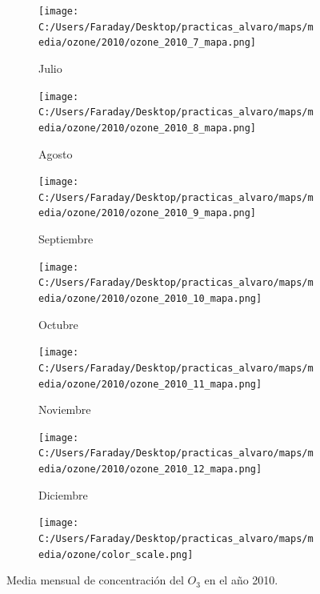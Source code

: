 \documentclass[12pt]{article}
\begin{document}
\begin{figure}[H]
\begin{subfigure}[H]{0.15\textwidth}
\texttt{[image: C:/Users/Faraday/Desktop/practicas\_alvaro/maps/media/ozone/2010/ozone\_2010\_7\_mapa.png]}
\captionsetup{labelformat=empty}
\caption{Julio}
\label{fig:map-ozone-2010-7}
\end{subfigure}
%
\begin{subfigure}[H]{0.15\textwidth}
\texttt{[image: C:/Users/Faraday/Desktop/practicas\_alvaro/maps/media/ozone/2010/ozone\_2010\_8\_mapa.png]}
\captionsetup{labelformat=empty}
\caption{Agosto}
\label{fig:map-ozone-2010-8}
\end{subfigure}
%
\begin{subfigure}[H]{0.15\textwidth}
\texttt{[image: C:/Users/Faraday/Desktop/practicas\_alvaro/maps/media/ozone/2010/ozone\_2010\_9\_mapa.png]}
\captionsetup{labelformat=empty}
\caption{Septiembre}
\label{fig:map-ozone-2010-9}
\end{subfigure}
%
\begin{subfigure}[H]{0.15\textwidth}
\texttt{[image: C:/Users/Faraday/Desktop/practicas\_alvaro/maps/media/ozone/2010/ozone\_2010\_10\_mapa.png]}
\captionsetup{labelformat=empty}
\caption{Octubre}
\label{fig:map-ozone-2010-10}
\end{subfigure}
%
\begin{subfigure}[H]{0.15\textwidth}
\texttt{[image: C:/Users/Faraday/Desktop/practicas\_alvaro/maps/media/ozone/2010/ozone\_2010\_11\_mapa.png]}
\captionsetup{labelformat=empty}
\caption{Noviembre}
\label{fig:map-ozone-2010-11}
\end{subfigure}
%
\begin{subfigure}[H]{0.15\textwidth}
\texttt{[image: C:/Users/Faraday/Desktop/practicas\_alvaro/maps/media/ozone/2010/ozone\_2010\_12\_mapa.png]}
\captionsetup{labelformat=empty}
\caption{Diciembre}
\label{fig:map-ozone-2010-12}
\end{subfigure}

\begin{subfigure}[H]{0.45\textwidth}
\texttt{[image: C:/Users/Faraday/Desktop/practicas\_alvaro/maps/media/ozone/color\_scale.png]}
\captionsetup{labelformat=empty}
\caption{}
\end{subfigure}

\vspace*{-7mm}
\caption{Media mensual de concentración del $O_{3}$ en el año 2010.}
\label{fig:map-ozone-2010}
\end{figure}
\end{document}
